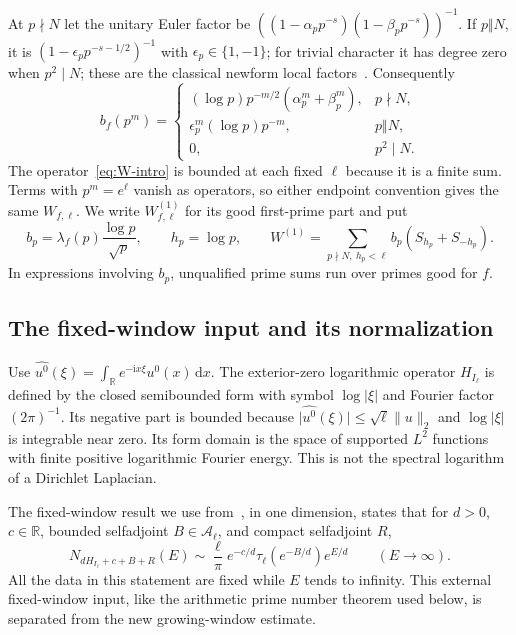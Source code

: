 \documentclass[11pt,reqno]{amsart}
\numberwithin{equation}{section}
\newcommand{\R}{\mathbb R}
\newcommand{\dd}{\,\mathrm d}
\newcommand{\ii}{\mathrm i}
\newcommand{\norm}[1]{\lVert#1\rVert}
\newcommand{\abs}[1]{\lvert#1\rvert}
\begin{document}
At $p\nmid N$ let the unitary Euler factor be
$((1-\alpha_pp^{-s})(1-\beta_pp^{-s}))^{-1}$.
If $p\Vert N$, it is $(1-\epsilon_pp^{-s-1/2})^{-1}$ with
$\epsilon_p\in\{1,-1\}$; for trivial character it has degree
zero when $p^2\mid N$; these are the classical newform local
factors~\cite{AL}. Consequently
\begin{equation}\label{eq:local-coefficients}
 b_f(p^m)=
 \begin{cases}
  (\log p)p^{-m/2}(\alpha_p^m+\beta_p^m),&p\nmid N,\\
  \epsilon_p^m(\log p)p^{-m},&p\Vert N,\\
  0,&p^2\mid N.
 \end{cases}
\end{equation}
The operator~\eqref{eq:W-intro} is bounded at each fixed $\ell$
because it is a finite sum. Terms with $p^m=e^\ell$ vanish as
operators, so either endpoint convention gives the same $W_{f,\ell}$.
We write $W_{f,\ell}^{(1)}$ for its good first-prime part and put
\begin{equation}\label{eq:first-coeff}
 b_p=\lambda_f(p)\frac{\log p}{\sqrt p},\qquad h_p=\log p,
 \qquad W^{(1)}=\sum_{p\nmid N,\ h_p<\ell}b_p(S_{h_p}+S_{-h_p}).
\end{equation}
In expressions involving $b_p$, unqualified prime sums run
over primes good for $f$.

\subsection*{The fixed-window input and its normalization}

Use $\widehat{u^0}(\xi)=\int_\R e^{-\ii x\xi}u^0(x)\dd x$.
The exterior-zero logarithmic operator $H_{I_\ell}$ is defined by
the closed semibounded form with symbol $\log\abs\xi$ and
Fourier factor $(2\pi)^{-1}$. Its negative part is bounded because
$\abs{\widehat{u^0}(\xi)}\le\sqrt\ell\norm u_2$ and
$\log\abs\xi$ is integrable near zero. Its form domain is the
space of supported $L^2$ functions with finite positive logarithmic
Fourier energy. This is not the spectral logarithm of a Dirichlet
Laplacian.

The fixed-window result we use from~\cite{ChandruW}, in one
dimension, states that for $d>0$, $c\in\R$, bounded selfadjoint
$B\in\mathcal A_\ell$, and compact selfadjoint $R$,
\begin{equation}\label{eq:fixed-weyl}
 N_{dH_{I_\ell}+c+B+R}(E)
 \sim\frac\ell\pi e^{-c/d}\tau_\ell(e^{-B/d})e^{E/d}
 \qquad(E\to\infty).
\end{equation}
All the data in this statement are fixed while $E$ tends to
infinity. This external fixed-window input, like the arithmetic
prime number theorem used below, is separated from the new
growing-window estimate.
\end{document}
